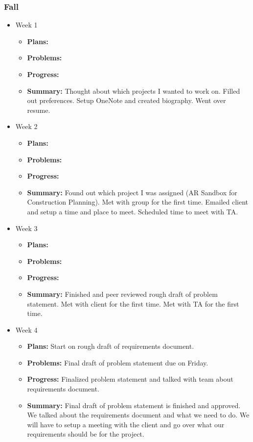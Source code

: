 \documentclass[onecolumn, draftclsnofoot,10pt, compsoc]{IEEEtran}
\begin{document}
\subsubsection{Fall}
\begin{itemize}
\item Week 1
	\begin{itemize}
	\item \textbf{Plans:}
    \item \textbf{Problems:}
    \item \textbf{Progress:}
    \item \textbf{Summary:} Thought about which projects I wanted to work on. Filled out preferences. Setup OneNote and created biography. Went over resume.
	\end{itemize}
\item Week 2
	\begin{itemize}
	\item \textbf{Plans:} 
    \item \textbf{Problems:} 
    \item \textbf{Progress:} 
    \item \textbf{Summary:} Found out which project I was assigned (AR Sandbox for Construction Planning). Met with group for the first time. Emailed client and setup a time and place to meet. Scheduled time to meet with TA.
	\end{itemize}
\item Week 3
	\begin{itemize}
	\item \textbf{Plans:} 
    \item \textbf{Problems:} 
    \item \textbf{Progress:} 
    \item \textbf{Summary:} Finished and peer reviewed rough draft of problem statement. Met with client for the first time. Met with TA for the first time.
	\end{itemize}
\item Week 4
	\begin{itemize}
	\item \textbf{Plans:} Start on rough draft of requirements document.
    \item \textbf{Problems:} Final draft of problem statement due on Friday.
    \item \textbf{Progress:} Finalized problem statement and talked with team about requirements document.
    \item \textbf{Summary:} Final draft of problem statement is finished and approved. We talked about the requirements document and what we need to do. We will have to setup a meeting with the client and go over what our requirements should be for the project.

\end{itemize}
\end{itemize}
\end{document}
